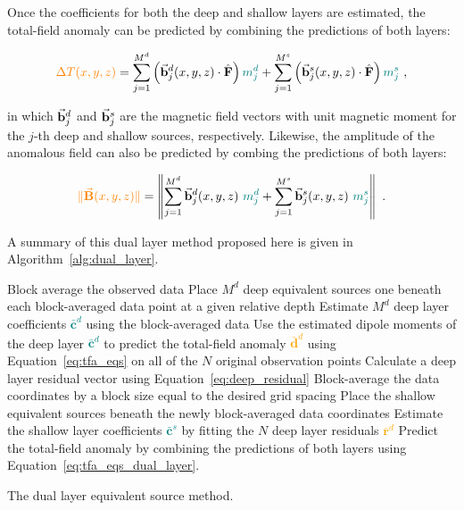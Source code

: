 Once the coefficients for both the deep and shallow layers are estimated, the total-field anomaly can be predicted by combining the predictions of both layers:

\begin{equation}
    \label{eq:tfa_eqs_dual_layer}
    \textcolor{orange}{\Delta T (x, y, z)} = 
    \sum_{j=1}^{M^d} \left(
        \vec{\mathbf{b}}^d_j(x, y, z) \cdot \hat{\mathbf{F}}
    \right) \textcolor{teal}{m_j^d}
    + \sum_{j=1}^{M^s} \left(
        \vec{\mathbf{b}}^s_j(x, y, z) \cdot \hat{\mathbf{F}}
    \right) \textcolor{teal}{m_j^s}
  \ ,
\end{equation}

\noindent
in which $\vec{\mathbf{b}}_j^d$ and $\vec{\mathbf{b}}_j^s$ are the magnetic field vectors with unit magnetic moment for the $j$-th deep and shallow sources, respectively.
Likewise, the amplitude of the anomalous field can also be predicted by combing the predictions of both layers:

\begin{equation}
  \textcolor{orange}{\norm{\vecbf{B}(x,y,z)}} =
  \left\lVert \sum_{j=1}^{M^d} \vecbf{b}^d_{j}(x,y,z)\ \textcolor{teal}{m^d_j}
  +
  \sum_{j=1}^{M^s}  \vecbf{b}^s_{j}(x,y,z)\ \textcolor{teal}{m^s_j}
  \right\rVert
  \ .
\end{equation}

\noindent
A summary of this dual layer method proposed here is given in Algorithm~\ref{alg:dual_layer}.

\begin{algorithm}[!htb]
  Block average the observed data
  \;
  Place $M^d$ deep equivalent sources one beneath each block-averaged data point at a given relative depth
  \;
  Estimate $M^d$ deep layer coefficients \textcolor{teal}{$\bar{\mathbf{c}}^d$} using the block-averaged data
  \;
  Use the estimated dipole moments of the deep layer \textcolor{teal}{$\bar{\mathbf{c}}^d$} to predict the total-field anomaly \textcolor{orange}{$\bar{\mathbf{d}}^d$} using Equation~\ref{eq:tfa_eqs} on all of the $N$ original observation points
  \;
  Calculate a deep layer residual vector using Equation~\ref{eq:deep_residual}
  \;
  Block-average the data coordinates by a block size equal to the desired grid spacing
  \;
  Place the shallow equivalent sources beneath the newly block-averaged data coordinates
  \;
  Estimate the shallow layer coefficients \textcolor{teal}{$\bar{\mathbf{c}}^s$} by fitting the $N$ deep layer residuals \textcolor{orange}{$\bar{\mathbf{r}}^d$}
  \;
   Predict the total-field anomaly by combining the predictions of both layers using Equation~\ref{eq:tfa_eqs_dual_layer}.
  \BlankLine
  \caption{The dual layer equivalent source method.}
  \label{alg:dual_layer}
\end{algorithm}


